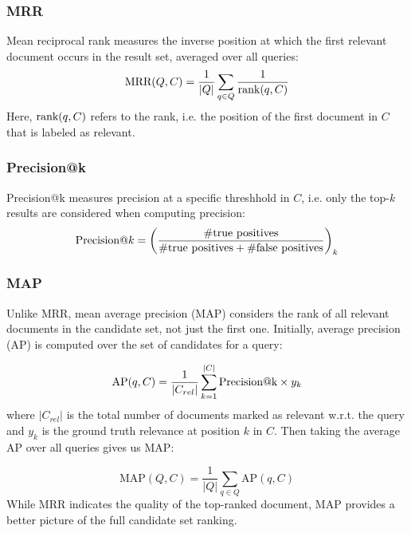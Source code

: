 \subsubsection{MRR}
Mean reciprocal rank measures the inverse position at which the first relevant document occurs in the result set, averaged over all queries:
\begin{equation}
    \text{MRR}(Q, C) = \frac{1}{|Q|} \sum_{q \in Q} \frac{1}{\text{rank}(q, C)}
\end{equation}
Here, $\text{rank}(q, C)$ refers to the rank, i.e. the position of the first document in $C$ that is labeled as relevant.

\subsubsection{Precision@k}
Precision@k measures precision at a specific threshhold in $C$, i.e. only the top-$k$ results are considered when computing precision:
\begin{equation}
    \text{Precision@}k = \bigg(\frac{\text{\#true positives}}{\text{\#true positives} + \text{\#false positives}}\bigg)_k
\end{equation}

\subsubsection{MAP}
Unlike MRR, mean average precision (MAP) considers the rank of all relevant documents in the candidate set, not just the first one. Initially, average precision (AP) is computed over the set of candidates for a query:

\begin{equation}
    \text{AP}(q, C) = \frac{1}{|C_{rel}|} \sum_{k=1}^{|C|} \text{Precision@k} \times y_k
\end{equation}
where $|C_{rel}|$ is the total number of documents marked as relevant w.r.t. the query and $y_k$ is the ground truth relevance at position $k$ in $C$. Then taking the average AP over all queries gives us MAP:

\begin{equation}
    \text{MAP}(Q, C) = \frac{1}{|Q|} \sum_{q \in Q} \text{AP}(q, C)
\end{equation}
While MRR indicates the quality of the top-ranked document, MAP provides a better picture of the full candidate set ranking.

